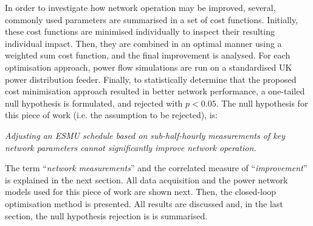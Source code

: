 In order to investigate how network operation may be improved, several, commonly used parameters are summarised in a set of cost functions.
Initially, these cost functions are minimised individually to inspect their resulting individual impact.
Then, they are combined in an optimal manner using a weighted sum cost function, and the final improvement is analysed.
For each optimisation approach, power flow simulations are run on a standardised UK power distribution feeder.
Finally, to statistically determine that the proposed cost minimisation approach resulted in better network performance, a one-tailed null hypothesis is formulated, and rejected with $p<0.05$.
The null hypothesis for this piece of work (i.e. the assumption to be rejected), is:

\textit{Adjusting an ESMU schedule based on sub-half-hourly measurements of key network parameters cannot significantly improve network operation.}

The term ``\textit{network measurements}'' and the correlated measure of ``\textit{improvement}'' is explained in the next section.
All data acquisition and the power network models used for this piece of work are shown next.
Then, the closed-loop optimisation method is presented.
All results are discussed and, in the last section, the null hypothesis rejection is is summarised.
